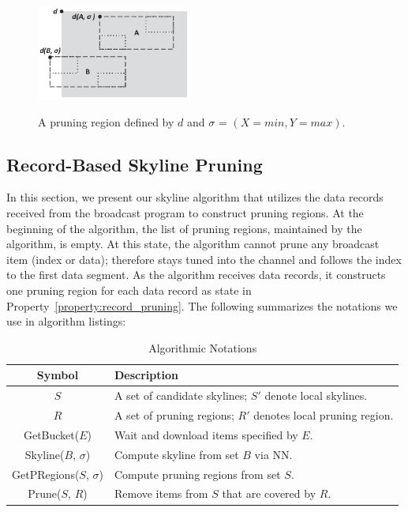 \begin{figure}
\begin{center}
\includegraphics[width=2in]{Figures/pruning.eps}
\vspace*{-5pt} \caption{A pruning region defined by $d$ and
$\sigma$ = $(X = min, Y = max)$.} \vspace*{-5pt}
\label{fig:pruning}
\end{center}
\end{figure}



\subsection{Record-Based Skyline Pruning}\label{sec-RPS}

In this section, we present our skyline algorithm that utilizes the data records received from the broadcast program to construct pruning regions. At the beginning of the algorithm, the list of pruning regions, maintained by the algorithm, is empty. At this state, the algorithm cannot prune any broadcast item (index or data); therefore stays tuned into the channel and follows the index to the first data segment. As the algorithm receives data records, it constructs one pruning region for each data record as state in Property~\ref{property:record_pruning}. The following summarizes the notations we use in algorithm listings:

\begin{table}[!h]
\centering \caption{Algorithmic Notations}\label{tab:alg}
\begin{tabular}{|c|p{2in}|}
\hline
{\bf Symbol} & {\bf Description}\\
\hline\hline
$S$ & A set of candidate skylines; $S'$ denote local skylines.\\
$R$ & A set of pruning regions; $R'$ denotes local pruning region.\\
GetBucket($E$) & Wait and download items specified by $E$. \\
Skyline($B$, $\sigma$) & Compute skyline from set $B$ via NN. \\
GetPRegions($S$, $\sigma$) & Compute pruning regions from set $S$. \\
Prune($S$, $R$) & Remove items from $S$ that are covered by $R$.\\
\hline
\end{tabular}
\end{table}

